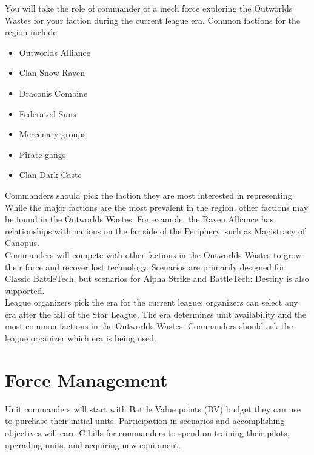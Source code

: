 \documentclass{article}
\begin{document}
You will take the role of commander of a mech force exploring the Outworlds Wastes for your faction during the current league era.
Common factions for the region include

\begin{itemize}

\item Outworlds Alliance

\item Clan Snow Raven

\item Draconis Combine

\item Federated Suns

\item Mercenary groups

\item Pirate gangs

\item Clan Dark Caste

\end{itemize}

Commanders should pick the faction they are most interested in representing.
While the major factions are the most prevalent in the region, other factions may be found in the Outworlds Wastes.
For example, the Raven Alliance has relationships with nations on the far side of the Periphery, such as Magistracy of Canopus.\\

Commanders will compete with other factions in the Outworlds Wastes to grow their force and recover lost technology.
Scenarios are primarily designed for Classic BattleTech, but scenarios for Alpha Strike and BattleTech: Destiny is also supported.\\

League organizers pick the era for the current league; organizers can select any era after the fall of the Star League.
The era determines unit availability and the most common factions in the Outworlds Wastes.
Commanders should ask the league organizer which era is being used.\\

\newpage

\section{Force Management}

Unit commanders will start with Battle Value points (BV) budget they can use to purchase their initial units.
Participation in scenarios and accomplishing objectives will earn C-bills for commanders to spend on training their pilots, upgrading units, and acquiring new equipment.
\end{document}

